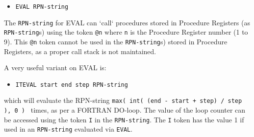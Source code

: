 \documentclass[a4paper,twoside,11pt]{article}
\newcommand{\newpara}{\par\vspace{4mm}\noindent}
\newcommand{\textttc}[1]{\texttt{\textcolor{OurRed}{#1}}}
\begin{document}
\begin{itemize}
\item \textttc{EVAL RPN-string}
\end{itemize}
The \texttt{RPN-string} for EVAL can `call` procedures stored in Procedure Registers (as \texttt{RPN-string}s) using the token
\texttt{@n} where \texttt{n} is the Procedure Register number (1 to 9). This \texttt{@n}  token cannot be used in the \texttt{RPN-string}s)
stored in Procedure Registers, as a proper call stack is not maintained.
\newpara
A very useful variant on EVAL is:
\begin{itemize}
\item \textttc{ITEVAL start end step RPN-string}
\end{itemize}
which will evaluate the RPN-string \texttt{max( int( (end - start + step) / step ), 0 ) } times, as per a FORTRAN DO-loop. The value of
the loop counter can be accessed using the token \texttt{I} in the \texttt{RPN-string}. The \texttt{I} token has the value 1 if used in an
\texttt{RPN-string} evaluated via \texttt{EVAL}.
\end{document}
